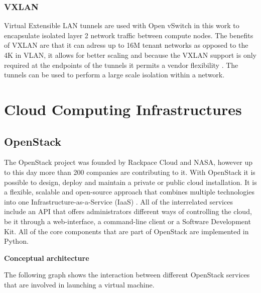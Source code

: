 \subsubsection{VXLAN}

Virtual Extensible LAN tunnels are used with Open vSwitch in this work to encapsulate isolated layer 2 network traffic between compute nodes. The benefits of VXLAN are that it can adress up to 16M tenant networks as opposed to the 4K in VLAN, it allows for better scaling and because the VXLAN support is only required at the endpoints of the tunnels it permits a vendor flexibility \cite{openstack-vxlan}. The tunnels can be used to perform a large scale isolation within a network.


\section{Cloud Computing Infrastructures}


\subsection{OpenStack}

The OpenStack project was founded by Rackpace Cloud and NASA, however up to this day  more than 200 companies are contributing to it.
With OpenStack it is possible to design, deploy and maintain a private or public cloud installation. It is a flexible, scalable and open-source approach that combines multiple technologies into one Infrastructure-as-a-Service (IaaS) \cite{openstack-ops}. All of the interrelated services include an API that offers administrators different ways of controlling the cloud, be it through a web-interface, a command-line client or a Software Development Kit. All of the core components that are part of OpenStack are implemented in Python.


\textbf{Conceptual architecture}

The following graph shows the interaction between different OpenStack services that are involved in launching a virtual machine.

